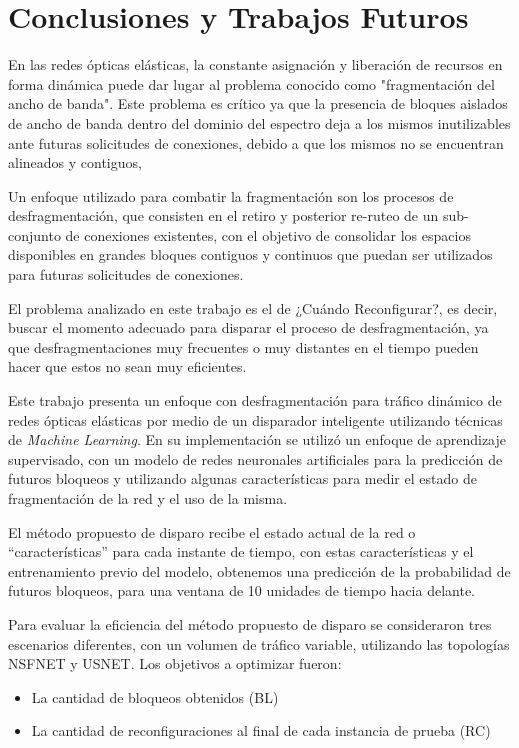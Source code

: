 \chapter{ Conclusiones y Trabajos Futuros }

En las redes ópticas elásticas, la constante asignación y liberación de recursos en forma dinámica puede dar lugar al problema conocido como "fragmentación del ancho de banda". Este problema es crítico ya que la presencia de bloques aislados de ancho de banda dentro del dominio del espectro deja a los mismos inutilizables ante futuras solicitudes de conexiones, debido a que los mismos no se encuentran alineados y contiguos,

Un enfoque utilizado para combatir la fragmentación son los procesos de desfragmentación, que consisten en el retiro y posterior re-ruteo de un sub-conjunto de conexiones existentes, con el objetivo de consolidar los espacios disponibles en grandes bloques contiguos y continuos que puedan ser utilizados para futuras solicitudes de conexiones.

El problema analizado en este trabajo es el de ¿Cuándo Reconfigurar?, es decir, buscar el momento adecuado para disparar el proceso de desfragmentación, ya que desfragmentaciones muy frecuentes o muy distantes en el tiempo pueden hacer que estos no sean muy eficientes.

Este trabajo presenta un enfoque con desfragmentación para tráfico dinámico de redes ópticas elásticas por medio de un disparador inteligente utilizando técnicas de \textit{Machine Learning}. En su implementación se utilizó un enfoque de aprendizaje supervisado, con un modelo de redes neuronales artificiales para la predicción de futuros bloqueos y utilizando algunas características para medir el estado de fragmentación de la red y el uso de la misma.

El método propuesto de disparo recibe el estado actual de la red o ``características'' para cada instante de tiempo, con estas características y el entrenamiento previo del modelo, obtenemos una predicción de la probabilidad de futuros bloqueos, para una ventana de 10 unidades de tiempo hacia delante.

Para evaluar la eficiencia del método propuesto de disparo se consideraron tres escenarios diferentes, con un volumen de tráfico variable, utilizando las topologías NSFNET y USNET. Los objetivos a optimizar fueron: 
\begin{itemize}
    \item La cantidad de bloqueos obtenidos (BL)
    \item La cantidad de reconfiguraciones al final de cada instancia de prueba (RC)
\end{itemize}

